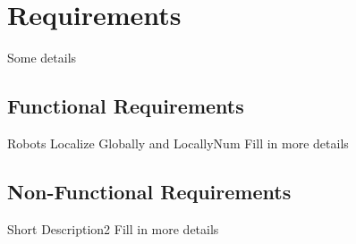 
\section{Requirements}
\label{sec:requirements}
Some details

\subsection{Functional Requirements}

\begin{functional_requirement}{Robots Localize Globally and Locally}{Num}
Fill in more details 
\end{functional_requirement}

\subsection{Non-Functional Requirements}

\begin{nonfunctional_requirement}{Short Description}{2}
Fill in more details 
\end{nonfunctional_requirement}